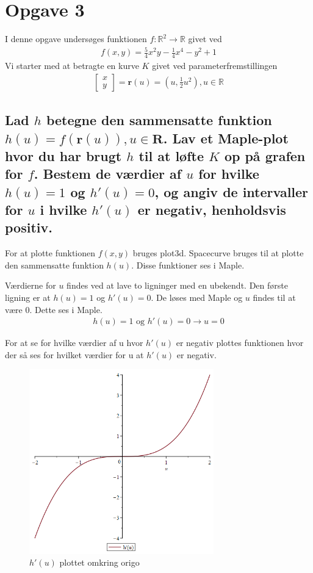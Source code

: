 \section{Opgave 3}
I denne opgave undersøges funktionen $f:\mathbb{R}^2 \rightarrow \mathbb{R}$ givet ved
\begin{align*}
f(x,y) = \frac{5}{4} x^2 y-\frac14 x^4 -y^2+1
\end{align*}
Vi starter med at betragte en kurve $K$ givet ved parameterfremstillingen
\begin{align}
\left[
    \begin{array}{c}
        x\\y
    \end{array}
\right] 
= \textbf{r}(u) = \left(u,\frac12 u^2 \right), u\in \mathbb{R}
\end{align}
\subsection{Lad $h$ betegne den sammensatte funktion $h(u)=f(\textbf{r}(u)),u\in \textbf{R}$. Lav et Maple-plot hvor du har brugt $h$ til at løfte $K$ op på grafen for $f$. Bestem de værdier af $u$ for hvilke $h(u)=1$ og $h'(u)=0$, og angiv de intervaller for $u$ i hvilke $h'(u)$ er negativ, henholdsvis positiv.}

For at plotte funktionen $f(x,y)$ bruges plot3d. Spacecurve bruges til at plotte den sammensatte funktion $h(u)$. Disse funktioner ses i Maple.

Værdierne for $u$ findes ved at lave to ligninger med en ubekendt. Den første ligning er at $h(u)=1$ og $h'(u)=0$. De løses med Maple og $u$ findes til at være 0. Dette ses i Maple.
\begin{align}
    h(u)=1 \text{ og } h'(u)=0 \rightarrow u=0
\end{align}

For at se for hvilke værdier af u hvor $h'(u)$ er negativ plottes funktionen hvor der så ses for hvilket værdier for u at $h'(u)$ er negativ.

\begin{figure}[htp]
    \centering
    \includegraphics[width=8cm]{diffh.png}
        \caption{$h'(u)$ plottet omkring origo}
    \label{diffh}
\end{figure}

